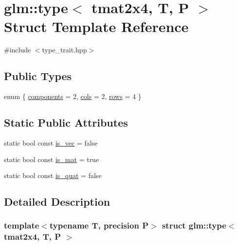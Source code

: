 \hypertarget{structglm_1_1type_3_01tmat2x4_00_01_t_00_01_p_01_4}{}\section{glm\+::type$<$ tmat2x4, T, P $>$ Struct Template Reference}
\label{structglm_1_1type_3_01tmat2x4_00_01_t_00_01_p_01_4}


{\ttfamily \#include $<$type\+\_\+trait.\+hpp$>$}

\subsection*{Public Types}
\begin{DoxyCompactItemize}
\item 
enum \{ \mbox{\hyperlink{structglm_1_1type_3_01tmat2x4_00_01_t_00_01_p_01_4_a5bcad875c6c89dcecc2d959022839737ac69fbaabf002730289dfc3bab02a2b10}{components}} = 2, 
\mbox{\hyperlink{structglm_1_1type_3_01tmat2x4_00_01_t_00_01_p_01_4_a5bcad875c6c89dcecc2d959022839737a2b920ce262a4c36d7087511ba586e221}{cols}} = 2, 
\mbox{\hyperlink{structglm_1_1type_3_01tmat2x4_00_01_t_00_01_p_01_4_a5bcad875c6c89dcecc2d959022839737ae3d37a70c74bfa16a0ba99c867169235}{rows}} = 4
 \}
\end{DoxyCompactItemize}
\subsection*{Static Public Attributes}
\begin{DoxyCompactItemize}
\item 
static bool const \mbox{\hyperlink{structglm_1_1type_3_01tmat2x4_00_01_t_00_01_p_01_4_a54a0dba0959b7ee6af5f60fc68125ca1}{is\+\_\+vec}} = false
\item 
static bool const \mbox{\hyperlink{structglm_1_1type_3_01tmat2x4_00_01_t_00_01_p_01_4_a957db726929de0402246a54984cdea2a}{is\+\_\+mat}} = true
\item 
static bool const \mbox{\hyperlink{structglm_1_1type_3_01tmat2x4_00_01_t_00_01_p_01_4_ab96ca1c8861fb97ab0bfa9a44d8a389c}{is\+\_\+quat}} = false
\end{DoxyCompactItemize}


\subsection{Detailed Description}
\subsubsection*{template$<$typename T, precision P$>$\newline
struct glm\+::type$<$ tmat2x4, T, P $>$}



